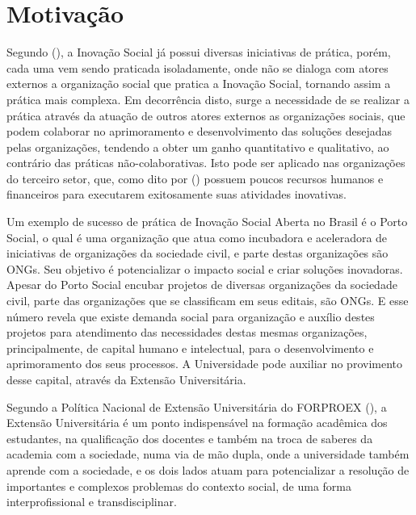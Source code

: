 \section{Motivação}
\label{motivacao}

Segundo \citeauthor{pinheiro2020} (\citeyear{pinheiro2020}), a Inovação Social já possui diversas iniciativas de prática, porém, cada uma vem sendo praticada isoladamente, onde não se dialoga com atores externos a organização social que pratica a Inovação Social, tornando assim a prática mais complexa. Em decorrência disto, surge a necessidade de se realizar a prática através da atuação de outros atores externos as organizações sociais, que podem colaborar no aprimoramento e desenvolvimento das soluções desejadas pelas organizações, tendendo a obter um ganho quantitativo e qualitativo, ao contrário das práticas não-colaborativas. Isto pode ser aplicado nas organizações do terceiro setor, que, como dito por \citeauthor{gama2023} (\citeyear{gama2023}) possuem poucos recursos humanos e financeiros para executarem exitosamente suas atividades inovativas.

Um exemplo de sucesso de prática de Inovação Social Aberta no Brasil é o Porto Social, o qual é uma organização que atua como incubadora e aceleradora de iniciativas de organizações da sociedade civil, e parte destas organizações são \gls{ONG}s. Seu objetivo é potencializar o impacto social e criar soluções inovadoras. Apesar do Porto Social encubar projetos de diversas organizações da sociedade civil, parte das organizações que se classificam em seus editais, são ONGs. E esse número revela que existe demanda social para organização e auxílio destes projetos para atendimento das necessidades destas mesmas organizações, principalmente, de capital humano e intelectual, para o desenvolvimento e aprimoramento dos seus processos. A Universidade pode auxiliar no provimento desse capital, através da Extensão Universitária. \cite{portosocial2023}

Segundo a Política Nacional de Extensão Universitária do \gls{FORPROEX} (\citeyear{forproex2016}), a Extensão Universitária é um ponto indispensável na formação acadêmica dos estudantes, na qualificação dos docentes e também na troca de saberes da academia com a sociedade, numa via de mão dupla, onde a universidade também aprende com a sociedade, e os dois lados atuam para potencializar a resolução de importantes e complexos problemas do contexto social, de uma forma interprofissional e transdisciplinar.



